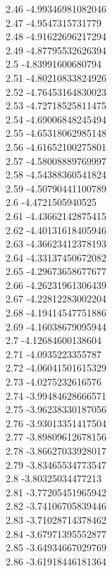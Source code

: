 {2.46	-4.99346981082046\\
2.47	-4.9547315731779\\
2.48	-4.91622696217294\\
2.49	-4.87795532626394\\
2.5	-4.83991600680794\\
2.51	-4.80210833824926\\
2.52	-4.76453164830023\\
2.53	-4.72718525811475\\
2.54	-4.69006848245494\\
2.55	-4.65318062985148\\
2.56	-4.61652100275801\\
2.57	-4.58008889769997\\
2.58	-4.54388360541824\\
2.59	-4.50790441100789\\
2.6	-4.4721505940525\\
2.61	-4.43662142875415\\
2.62	-4.40131618405946\\
2.63	-4.36623412378193\\
2.64	-4.33137450672082\\
2.65	-4.29673658677677\\
2.66	-4.26231961306439\\
2.67	-4.22812283002204\\
2.68	-4.19414547751886\\
2.69	-4.16038679095944\\
2.7	-4.12684600138604\\
2.71	-4.0935223355787\\
2.72	-4.06041501615329\\
2.73	-4.0275232616576\\
2.74	-3.99484628666571\\
2.75	-3.96238330187056\\
2.76	-3.93013351417504\\
2.77	-3.89809612678156\\
2.78	-3.86627033928017\\
2.79	-3.83465534773547\\
2.8	-3.80325034477213\\
2.81	-3.77205451965942\\
2.82	-3.74106705839446\\
2.83	-3.71028714378462\\
2.84	-3.67971395552877\\
2.85	-3.64934667029769\\
2.86	-3.61918446181364\\
}
